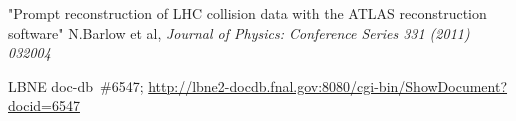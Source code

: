\begin{thebibliography}{99}
 "Prompt reconstruction of LHC collision data with the ATLAS reconstruction software" N.Barlow et al, \textit{Journal of Physics: Conference Series 331 (2011) 032004}

%
%
 
%
%
 LBNE doc-db~\#6547; \url{http://lbne2-docdb.fnal.gov:8080/cgi-bin/ShowDocument?docid=6547}

%
%


\end{thebibliography}
